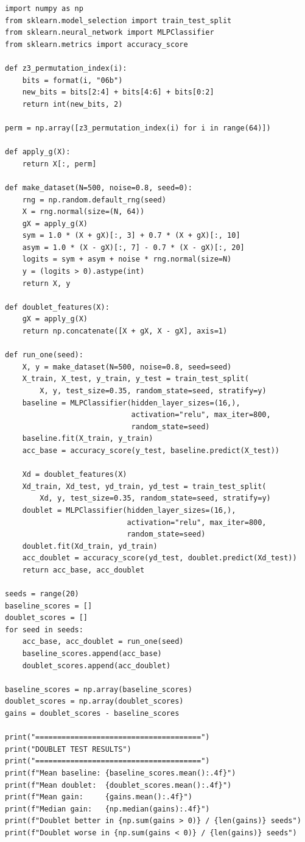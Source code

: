 \documentclass[11pt,a4paper]{report}
\begin{document}
\label{app:ch3-lst3}
\begin{lstlisting}[caption=SBOHN Experiment 2: doublet with small data]
import numpy as np
from sklearn.model_selection import train_test_split
from sklearn.neural_network import MLPClassifier
from sklearn.metrics import accuracy_score

def z3_permutation_index(i):
    bits = format(i, "06b")
    new_bits = bits[2:4] + bits[4:6] + bits[0:2]
    return int(new_bits, 2)

perm = np.array([z3_permutation_index(i) for i in range(64)])

def apply_g(X):
    return X[:, perm]

def make_dataset(N=500, noise=0.8, seed=0):
    rng = np.random.default_rng(seed)
    X = rng.normal(size=(N, 64))
    gX = apply_g(X)
    sym = 1.0 * (X + gX)[:, 3] + 0.7 * (X + gX)[:, 10]
    asym = 1.0 * (X - gX)[:, 7] - 0.7 * (X - gX)[:, 20]
    logits = sym + asym + noise * rng.normal(size=N)
    y = (logits > 0).astype(int)
    return X, y

def doublet_features(X):
    gX = apply_g(X)
    return np.concatenate([X + gX, X - gX], axis=1)

def run_one(seed):
    X, y = make_dataset(N=500, noise=0.8, seed=seed)
    X_train, X_test, y_train, y_test = train_test_split(
        X, y, test_size=0.35, random_state=seed, stratify=y)
    baseline = MLPClassifier(hidden_layer_sizes=(16,),
                             activation="relu", max_iter=800,
                             random_state=seed)
    baseline.fit(X_train, y_train)
    acc_base = accuracy_score(y_test, baseline.predict(X_test))

    Xd = doublet_features(X)
    Xd_train, Xd_test, yd_train, yd_test = train_test_split(
        Xd, y, test_size=0.35, random_state=seed, stratify=y)
    doublet = MLPClassifier(hidden_layer_sizes=(16,),
                            activation="relu", max_iter=800,
                            random_state=seed)
    doublet.fit(Xd_train, yd_train)
    acc_doublet = accuracy_score(yd_test, doublet.predict(Xd_test))
    return acc_base, acc_doublet

seeds = range(20)
baseline_scores = []
doublet_scores = []
for seed in seeds:
    acc_base, acc_doublet = run_one(seed)
    baseline_scores.append(acc_base)
    doublet_scores.append(acc_doublet)

baseline_scores = np.array(baseline_scores)
doublet_scores = np.array(doublet_scores)
gains = doublet_scores - baseline_scores

print("======================================")
print("DOUBLET TEST RESULTS")
print("======================================")
print(f"Mean baseline: {baseline_scores.mean():.4f}")
print(f"Mean doublet:  {doublet_scores.mean():.4f}")
print(f"Mean gain:     {gains.mean():.4f}")
print(f"Median gain:   {np.median(gains):.4f}")
print(f"Doublet better in {np.sum(gains > 0)} / {len(gains)} seeds")
print(f"Doublet worse in {np.sum(gains < 0)} / {len(gains)} seeds")
\end{lstlisting}
\end{document}
